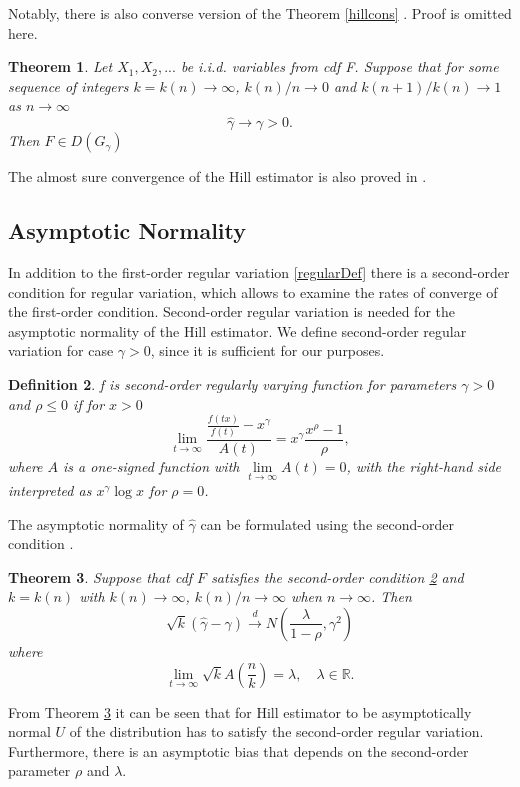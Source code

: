\documentclass[english,12pt,a4paper,pdftex,sci,utf8]{aaltothesis} %
\newtheorem{theorem}{Theorem}[section]
\newtheorem{definition}[theorem]{Definition}
\begin{document}
Notably, there is also converse version of the Theorem \ref{hillcons} \cite{mason}. Proof is omitted here.

\begin{theorem}
Let $X_1, X_2,...$ be i.i.d. variables from cdf F. Suppose that for some sequence of integers $k=k(n) \rightarrow \infty$, $k(n)/n \rightarrow 0$ and $k(n+1)/k(n) \rightarrow 1$ as $n \rightarrow \infty$
\begin{equation*}
\hat{\gamma} \rightarrow \gamma > 0.
\end{equation*}
Then $F \in D(G_{\gamma})$
\end{theorem}

The almost sure convergence of the Hill estimator is also proved in \cite{mason}.

\subsection{Asymptotic Normality}


In addition to the first-order regular variation \ref{regularDef} there is a second-order condition for regular variation, which allows to examine the rates of converge of the first-order condition. Second-order regular variation is needed for the asymptotic normality of the Hill estimator. We define second-order regular variation for case $\gamma > 0$, since it is sufficient for our purposes.

\begin{definition}
f is second-order regularly varying function for parameters $\gamma>0$ and $\rho \leq 0$ if for $x>0$
\begin{equation*}
\lim_{t \rightarrow \infty} \frac{\frac{f(tx)}{f(t)}-x^{\gamma}}{A(t)} = x^{\gamma} \frac{x^{\rho}-1}{\rho},
\end{equation*}
where $A$ is a one-signed function with $\lim\limits_{t \rightarrow \infty} A(t)=0$, with the right-hand side interpreted as $x^\gamma \log x$ for $\rho = 0$.
\label{2RV}
\end{definition}


The asymptotic normality of $\hat{\gamma}$ can be formulated using the second-order condition \cite{peng}.

\begin{theorem}
Suppose that cdf $F$ satisfies the second-order condition \ref{2RV} and $k=k(n)$ with $k(n)\rightarrow \infty$, $k(n)/n \rightarrow \infty$ when $n\rightarrow \infty$. Then
\begin{equation*}
\sqrt{k}(\hat{\gamma} - \gamma) \xrightarrow{d} N \left( \frac{\lambda}{1- \rho}, \gamma^2 \right)
\end{equation*}
where
\begin{equation*}
\lim_{t \rightarrow \infty} \sqrt{k}A \left(\frac{n}{k} \right) = \lambda, \quad \lambda \in \mathbb{R}.
\end{equation*}
\label{normality}
\end{theorem}
From Theorem \ref{normality} it can be seen that for Hill estimator to be asymptotically normal $U$ of the distribution has to satisfy the second-order regular variation. Furthermore, there is an asymptotic bias that depends on the second-order parameter $\rho$ and $\lambda$.
\end{document}
